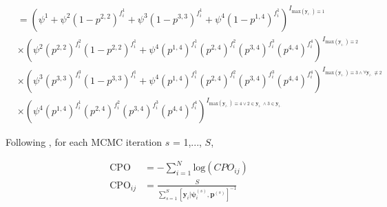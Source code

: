 \documentclass[12pt]{article}
\begin{document}
\begin{center}
\begin{align*}
[\textbf{y}_{i}|\boldsymbol{\psi}_{i}, \boldsymbol{p}]  &= \left(\psi^1+\psi^2(1-p^{2,2})^{f_{i}^1}+ \psi^3(1-p^{3,3})^{f_{i}^1}+\psi^4(1-p^{1,4})^{f_{i}^1}\right)^{I_{\text{max}(\boldsymbol{y}_{i\cdot})\equiv 1}}\\
&\times  \left(\psi^2(p^{2,2})^{f_{i}^2}(1-p^{2,2})^{f_{i}^1}+\psi^4(p^{1,4})^{f_{i}^1}(p^{2,4})^{f_{i}^2}(p^{3,4})^{f_{i}^3}(p^{4,4})^{f_{i}^4}\right)^{I_{\text{max}(\boldsymbol{y}_{i\cdot})\equiv 2}} \\
&\times  \left(\psi^3(p^{3,3})^{f_{i}^3}(1-p^{3,3})^{f_{i}^1}+\psi^4(p^{1,4})^{f_{i}^1}(p^{2,4})^{f_{i}^2}(p^{3,4})^{f_{i}^3}(p^{4,4})^{f_{i}^4}\right)^{I_{\text{max}(\boldsymbol{y}_{i\cdot})\equiv 3 \wedge \forall \boldsymbol{y}_{i\cdot}\not\equiv 2}}\\
&\times  \left(\psi^4(p^{1,4})^{f_{i}^1}(p^{2,4})^{f_{i}^2}(p^{3,4})^{f_{i}^3}(p^{4,4})^{f_{i}^4}\right)^{I_{\text{max}(\boldsymbol{y}_{i\cdot})\equiv 4 \vee 2\in \boldsymbol{y}_{i\cdot}\wedge 3 \in \boldsymbol{y}_{i\cdot}}}
\end{align*}
\end{center}


Following \citealt{broms2016}, for each MCMC iteration $s$ = 1,..., $S$,
\begin{center}
\begin{align*}
\text{CPO}  &=-\sum_{i=1}^{N} \text{log}(CPO_{ij})\\
\text{CPO}_{ij}  &=\frac{S}{\sum_{s=1}^S [\textbf{y}_{i}|\boldsymbol{\psi}_{i}^{(s)}, \boldsymbol{p}^{(s)} ]^{-1}}\\
\end{align*}
\end{center}
\end{document}
